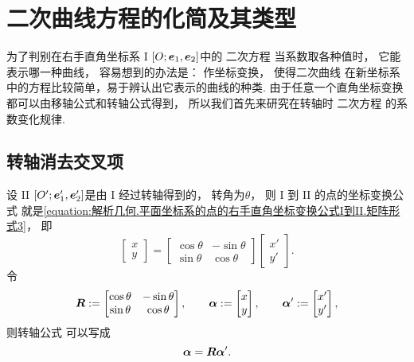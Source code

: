 \section{二次曲线方程的化简及其类型}
为了判别在右手直角坐标系 I \([O;\boldsymbol{e}_1,\boldsymbol{e}_2]\)中的
二次方程 
当系数取各种值时，
它能表示哪一种曲线，
容易想到的办法是：
作坐标变换，
使得二次曲线 
在新坐标系中的方程比较简单，易于辨认出它表示的曲线的种类.
由于任意一个直角坐标变换都可以由移轴公式和转轴公式得到，
所以我们首先来研究在转轴时
二次方程  的系数变化规律.

\subsection{转轴消去交叉项}
设 II \([O';\boldsymbol{e}_1',\boldsymbol{e}_2']\)是由 I 经过转轴得到的，
转角为\(\theta\)，
则 I 到 II 的点的坐标变换公式
就是\cref{equation:解析几何.平面坐标系的点的右手直角坐标变换公式I到II.矩阵形式3}，
即\begin{equation}
	\begin{bmatrix}
		x \\ y
	\end{bmatrix}
	= \begin{bmatrix}
		\cos\theta & -\sin\theta \\
		\sin\theta & \cos\theta
	\end{bmatrix}
	\begin{bmatrix}
		x' \\ y'
	\end{bmatrix}.
\end{equation}
令\begin{equation*}
	\boldsymbol{R} := \begin{bmatrix}
		\cos\theta & -\sin\theta \\
		\sin\theta & \cos\theta
	\end{bmatrix},
	\qquad
	\boldsymbol\alpha := \begin{bmatrix}
		x \\ y
	\end{bmatrix},
	\qquad
	\boldsymbol\alpha' := \begin{bmatrix}
		x' \\ y'
	\end{bmatrix},
\end{equation*}
则转轴公式 
可以写成\begin{equation*}
	\boldsymbol\alpha = \boldsymbol{R} \boldsymbol\alpha'.
\end{equation*}

